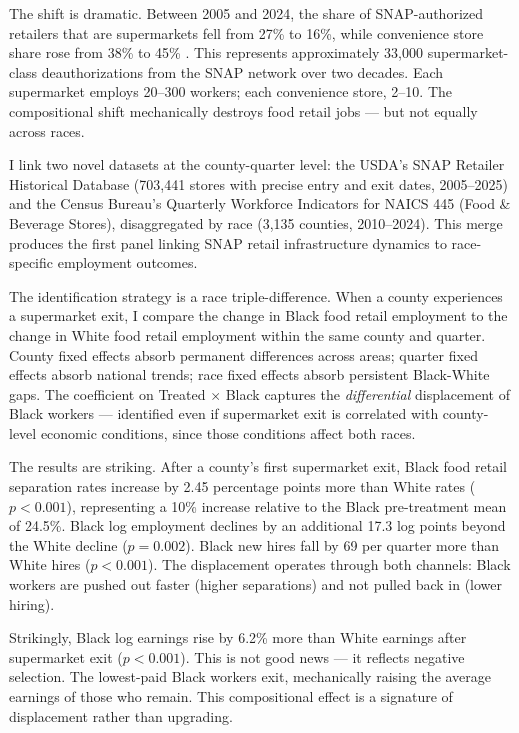 \documentclass[12pt]{article}
\begin{document}
The shift is dramatic. Between 2005 and 2024, the share of SNAP-authorized retailers that are supermarkets fell from 27\% to 16\%, while convenience store share rose from 38\% to 45\% \citep{usda2023snap}. This represents approximately 33,000 supermarket-class deauthorizations from the SNAP network over two decades. Each supermarket employs 20--300 workers; each convenience store, 2--10. The compositional shift mechanically destroys food retail jobs --- but not equally across races.

I link two novel datasets at the county-quarter level: the USDA's SNAP Retailer Historical Database (703,441 stores with precise entry and exit dates, 2005--2025) and the Census Bureau's Quarterly Workforce Indicators for NAICS 445 (Food \& Beverage Stores), disaggregated by race (3,135 counties, 2010--2024). This merge produces the first panel linking SNAP retail infrastructure dynamics to race-specific employment outcomes.

The identification strategy is a race triple-difference. When a county experiences a supermarket exit, I compare the change in Black food retail employment to the change in White food retail employment within the same county and quarter. County fixed effects absorb permanent differences across areas; quarter fixed effects absorb national trends; race fixed effects absorb persistent Black-White gaps. The coefficient on Treated $\times$ Black captures the \textit{differential} displacement of Black workers --- identified even if supermarket exit is correlated with county-level economic conditions, since those conditions affect both races.

The results are striking. After a county's first supermarket exit, Black food retail separation rates increase by 2.45 percentage points more than White rates ($p < 0.001$), representing a 10\% increase relative to the Black pre-treatment mean of 24.5\%. Black log employment declines by an additional 17.3 log points beyond the White decline ($p = 0.002$). Black new hires fall by 69 per quarter more than White hires ($p < 0.001$). The displacement operates through both channels: Black workers are pushed out faster (higher separations) and not pulled back in (lower hiring).

Strikingly, Black log earnings rise by 6.2\% more than White earnings after supermarket exit ($p < 0.001$). This is not good news --- it reflects negative selection. The lowest-paid Black workers exit, mechanically raising the average earnings of those who remain. This compositional effect is a signature of displacement rather than upgrading.
\end{document}
